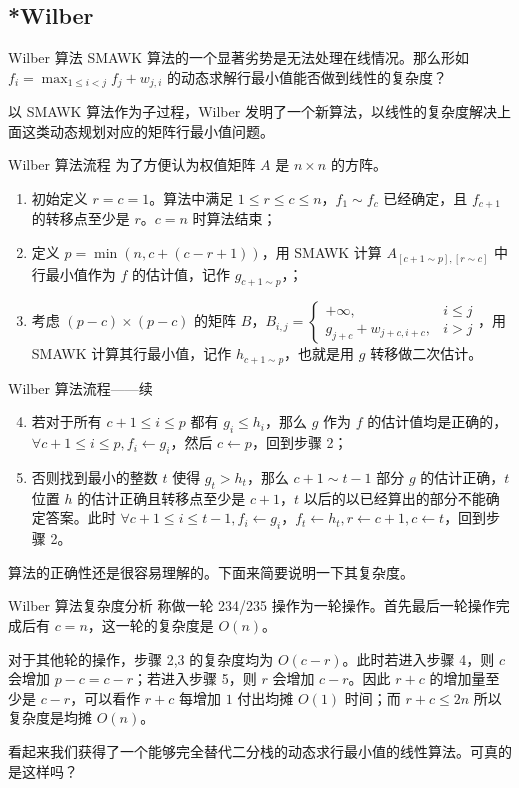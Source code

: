 \documentclass{beamer}
\begin{document}
\subsection{*Wilber}
\begin{frame}{Wilber 算法}
	SMAWK 算法的一个显著劣势是无法处理在线情况。那么形如 $f_i = \max_{1 \leq i < j} f_j + w_{j,i}$ 的动态求解行最小值能否做到线性的复杂度？
	
	以 SMAWK 算法作为子过程，Wilber 发明了一个新算法，以线性的复杂度解决上面这类动态规划对应的矩阵行最小值问题。
\end{frame}
\begin{frame}{Wilber 算法流程}
	为了方便认为权值矩阵 $A$ 是 $n \times n$ 的方阵。
	\begin{enumerate}
		\item 初始定义 $r=c=1$。算法中满足 $1 \leq r \leq c \leq n$，$f_1 \sim f_c$ 已经确定，且 $f_{c+1}$ 的转移点至少是 $r$。$c=n$ 时算法结束；
		\item 定义 $p = \min(n,c+(c-r+1))$，用 SMAWK 计算 $A_{[c+1 \sim p],[r \sim c]}$ 中行最小值作为 $f$ 的估计值，记作 $g_{c+1 \sim p}$，；
		\item 考虑 $(p-c) \times (p-c)$ 的矩阵 $B$，$B_{i,j} = \begin{cases}
		+\infty, & i \leq j \\
		g_{j+c} + w_{j+c,i+c}, & i > j
		\end{cases}$，用 SMAWK 计算其行最小值，记作 $h_{c+1 \sim p}$，也就是用 $g$ 转移做二次估计。
	\end{enumerate}
\end{frame}
\begin{frame}{Wilber 算法流程——续}
\begin{enumerate}\setcounter{enumi}{3}
	\item 若对于所有 $c+1 \leq i \leq p$ 都有 $g_i \leq h_i$，那么 $g$ 作为 $f$ 的估计值均是正确的，$\forall c+1 \leq i \leq p, f_i \leftarrow g_i$，然后 $c \leftarrow p$，回到步骤 2；
	\item 否则找到最小的整数 $t$ 使得 $g_t > h_t$，那么 $c+1 \sim t-1$ 部分 $g$ 的估计正确，$t$ 位置 $h$ 的估计正确且转移点至少是 $c+1$，$t$ 以后的以已经算出的部分不能确定答案。此时 $\forall c+1 \leq i \leq t-1,f_i \leftarrow g_i$，$f_t \leftarrow h_t, r \leftarrow c+1,c \leftarrow t$，回到步骤 2。
\end{enumerate}
算法的正确性还是很容易理解的。下面来简要说明一下其复杂度。
\end{frame}
\begin{frame}{Wilber 算法复杂度分析}
	称做一轮 234/235 操作为一轮操作。首先最后一轮操作完成后有 $c=n$，这一轮的复杂度是 $O(n)$。
	
	对于其他轮的操作，步骤 2,3 的复杂度均为 $O(c-r)$。此时若进入步骤 4，则 $c$ 会增加 $p-c = c-r$；若进入步骤 5，则 $r$ 会增加 $c-r$。因此 $r+c$ 的增加量至少是 $c-r$，可以看作 $r+c$ 每增加 $1$ 付出均摊 $O(1)$ 时间；而 $r+c \leq 2n$ 所以复杂度是均摊 $O(n)$。\pause
	
	看起来我们获得了一个能够完全替代二分栈的动态求行最小值的线性算法。可真的是这样吗？
\end{frame}
\end{document}
